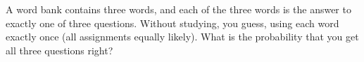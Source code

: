 A word bank contains three words, and each of the three words is the answer to exactly one of three questions. Without studying, you guess, using each word exactly once (all assignments equally likely). What is the probability that you get all three questions right?
